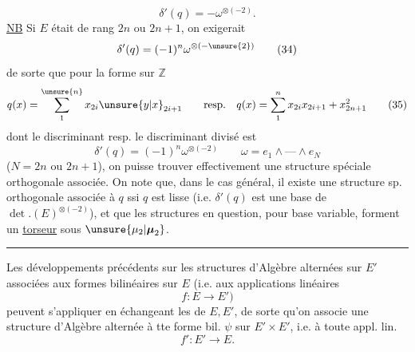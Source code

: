 \[
 \delta'(q)=-\omega^{\otimes(-2)} . \tag*{(33)}
\]
\uline{NB} Si $E$ était de rang $2n$ ou $2n+1$, on  exigerait
\[
 \delta'(q)=(-1)^n\omega^{\otimes(-\unsure{2})} \tag*{(34)}
\]
de sorte que pour la forme  sur $\mathbb Z$
\[
 q(x)=\sum_1^{\unsure{n}}x_{2i}\unsure{y|x}_{2i+1}
 \qquad\text{resp.}\quad q(x)=\sum_1^n x_{2i}x_{2i+1}+x_{2n+1}^2 \tag*{(35)}
\]
dont le discriminant resp. le discriminant divisé est
\[
 \delta'(q)=(-1)^n\omega^{\otimes(-2)}\qquad \omega=e_1\wedge\text{---}\wedge e_N \tag*{(36)}
\]
($N=2n$ ou $2n+1$), on puisse trouver effectivement une structure spéciale orthogonale associée. On note que, dans le cas général, il existe  une structure sp. orthogonale associée à $q$ ssi $q$ est lisse (i.e. $\delta'(q)$ est une base de $\det.(E)^{\otimes(-2)}$), et que les structures en question, pour base variable, forment un \uline{torseur} sous $\unsure{\mu_2|\boldsymbol{\mu}_2}$.

\begin{center}\rule{1.3cm}{0.4pt}\end{center}

Les développements précédents sur les structures d'Algèbre alternées sur $E'$ associées aux formes bilinéaires sur $E$ (i.e. aux applications linéaires
\[
 f:E\longrightarrow E')
\]
peuvent s'appliquer en échangeant les  de $E,E'$, de sorte qu'on associe une structure d'Algèbre alternée  à tte forme bil. $\psi$ sur $E'\times E'$, i.e. à toute appl. lin.
\[
 f':E'\longrightarrow E .
\]

